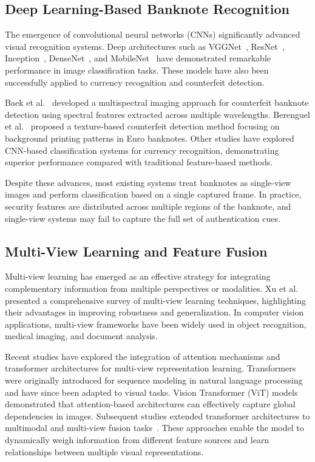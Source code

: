 \documentclass[preprint,12pt,authoryear]{elsarticle}
\begin{document}
\subsection{Deep Learning-Based Banknote Recognition}

The emergence of convolutional neural networks (CNNs) significantly advanced visual recognition systems. Deep architectures such as VGGNet~\cite{simonyan2015vgg}, ResNet~\cite{he2016deep}, Inception~\cite{szegedy2016inception}, DenseNet~\cite{huang2017densely}, and MobileNet~\cite{sandler2018mobilenetv2} have demonstrated remarkable performance in image classification tasks. These models have also been successfully applied to currency recognition and counterfeit detection.

Baek et al.~\cite{baek2018counterfeit} developed a multispectral imaging approach for counterfeit banknote detection using spectral features extracted across multiple wavelengths. Berenguel et al.~\cite{berenguel2016banknote} proposed a texture-based counterfeit detection method focusing on background printing patterns in Euro banknotes. Other studies have explored CNN-based classification systems for currency recognition, demonstrating superior performance compared with traditional feature-based methods.

Despite these advances, most existing systems treat banknotes as single-view images and perform classification based on a single captured frame. In practice, security features are distributed across multiple regions of the banknote, and single-view systems may fail to capture the full set of authentication cues.

\subsection{Multi-View Learning and Feature Fusion}

Multi-view learning has emerged as an effective strategy for integrating complementary information from multiple perspectives or modalities. Xu et al.~\cite{xu2013survey} presented a comprehensive survey of multi-view learning techniques, highlighting their advantages in improving robustness and generalization. In computer vision applications, multi-view frameworks have been widely used in object recognition, medical imaging, and document analysis.

Recent studies have explored the integration of attention mechanisms and transformer architectures for multi-view representation learning. Transformers were originally introduced for sequence modeling in natural language processing~\cite{vaswani2017attention} and have since been adapted to visual tasks. Vision Transformer (ViT) models~\cite{dosovitskiy2021vit} demonstrated that attention-based architectures can effectively capture global dependencies in images. Subsequent studies extended transformer architectures to multimodal and multi-view fusion tasks~\cite{zhou2021cross,liu2021swin}. These approaches enable the model to dynamically weigh information from different feature sources and learn relationships between multiple visual representations.
\end{document}
